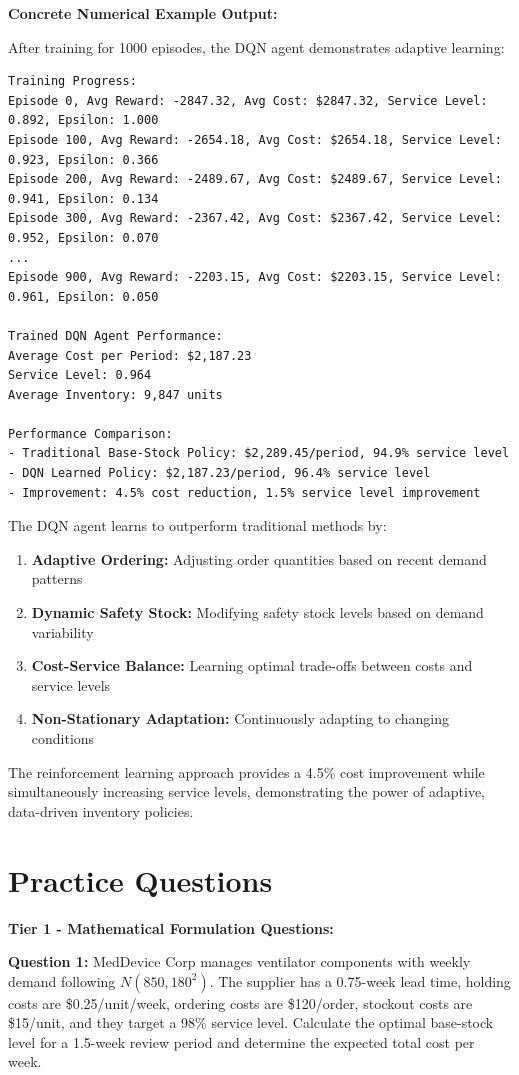 \documentclass{article}
\begin{document}
\textbf{Concrete Numerical Example Output:}

After training for 1000 episodes, the DQN agent demonstrates adaptive learning:

\begin{verbatim}
Training Progress:
Episode 0, Avg Reward: -2847.32, Avg Cost: $2847.32, Service Level: 0.892, Epsilon: 1.000
Episode 100, Avg Reward: -2654.18, Avg Cost: $2654.18, Service Level: 0.923, Epsilon: 0.366
Episode 200, Avg Reward: -2489.67, Avg Cost: $2489.67, Service Level: 0.941, Epsilon: 0.134
Episode 300, Avg Reward: -2367.42, Avg Cost: $2367.42, Service Level: 0.952, Epsilon: 0.070
...
Episode 900, Avg Reward: -2203.15, Avg Cost: $2203.15, Service Level: 0.961, Epsilon: 0.050

Trained DQN Agent Performance:
Average Cost per Period: $2,187.23
Service Level: 0.964
Average Inventory: 9,847 units

Performance Comparison:
- Traditional Base-Stock Policy: $2,289.45/period, 94.9% service level
- DQN Learned Policy: $2,187.23/period, 96.4% service level
- Improvement: 4.5% cost reduction, 1.5% service level improvement
\end{verbatim}

The DQN agent learns to outperform traditional methods by:
\begin{enumerate}
\item \textbf{Adaptive Ordering:} Adjusting order quantities based on recent demand patterns
\item \textbf{Dynamic Safety Stock:} Modifying safety stock levels based on demand variability
\item \textbf{Cost-Service Balance:} Learning optimal trade-offs between costs and service levels
\item \textbf{Non-Stationary Adaptation:} Continuously adapting to changing conditions
\end{enumerate}

The reinforcement learning approach provides a 4.5\% cost improvement while simultaneously increasing service levels, demonstrating the power of adaptive, data-driven inventory policies.

\section{Practice Questions}

\textbf{Tier 1 - Mathematical Formulation Questions:}

\textbf{Question 1:} MedDevice Corp manages ventilator components with weekly demand following $N(850, 180^2)$. The supplier has a 0.75-week lead time, holding costs are \$0.25/unit/week, ordering costs are \$120/order, stockout costs are \$15/unit, and they target a 98\% service level. Calculate the optimal base-stock level for a 1.5-week review period and determine the expected total cost per week.
\end{document}
